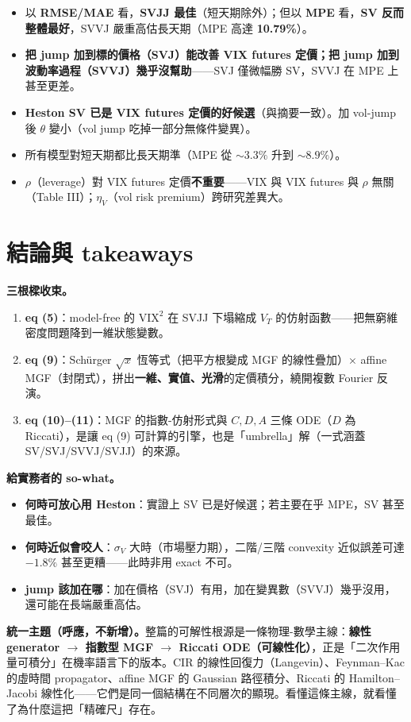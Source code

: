 \documentclass[12pt, a4paper]{article}
\theoremstyle{remark}
\newcommand{\VIX}{\mathrm{VIX}}
\begin{document}
\begin{keybox}[title={核心結論（呼應摘要，忠實轉述）}]
\begin{itemize}[topsep=2pt, itemsep=2pt]
  \item 以 \textbf{RMSE/MAE} 看，\textbf{SVJJ 最佳}（短天期除外）；但以 \textbf{MPE} 看，\textbf{SV 反而整體最好}，SVVJ 嚴重高估長天期（MPE 高達 \textbf{10.79\%}）。
  \item \textbf{把 jump 加到標的價格（SVJ）能改善 VIX futures 定價；把 jump 加到波動率過程（SVVJ）幾乎沒幫助}——SVJ 僅微幅勝 SV，SVVJ 在 MPE 上甚至更差。
  \item \textbf{Heston SV 已是 VIX futures 定價的好候選}（與摘要一致）。加 vol-jump 後 $\theta$ 變小（vol jump 吃掉一部分無條件變異）。
  \item 所有模型對短天期都比長天期準（MPE 從 $\sim3.3\%$ 升到 $\sim8.9\%$）。
  \item $\rho$（leverage）對 VIX futures 定價\textbf{不重要}——VIX 與 VIX futures 與 $\rho$ 無關（Table III）；$\eta_V$（vol risk premium）跨研究差異大。
\end{itemize}
\end{keybox}

\newpage

\section{結論與 takeaways}

\textbf{三根樑收束。}
\begin{enumerate}[topsep=2pt, itemsep=2pt]
  \item \textbf{eq (5)}：model-free 的 $\VIX^2$ 在 SVJJ 下塌縮成 $V_T$ 的仿射函數——把無窮維密度問題降到一維狀態變數。
  \item \textbf{eq (9)}：Schürger $\sqrt{x}$ 恆等式（把平方根變成 MGF 的線性疊加）$\times$ affine MGF（封閉式），拼出\textbf{一維、實值、光滑}的定價積分，繞開複數 Fourier 反演。
  \item \textbf{eq (10)--(11)}：MGF 的指數-仿射形式與 $C,D,A$ 三條 ODE（$D$ 為 Riccati），是讓 eq (9) 可計算的引擎，也是「umbrella」解（一式涵蓋 SV/SVJ/SVVJ/SVJJ）的來源。
\end{enumerate}

\textbf{給實務者的 so-what。}
\begin{itemize}[topsep=2pt, itemsep=1pt]
  \item \textbf{何時可放心用 Heston}：實證上 SV 已是好候選；若主要在乎 MPE，SV 甚至最佳。
  \item \textbf{何時近似會咬人}：$\sigma_V$ 大時（市場壓力期），二階/三階 convexity 近似誤差可達 $-1.8\%$ 甚至更糟——此時非用 exact 不可。
  \item \textbf{jump 該加在哪}：加在價格（SVJ）有用，加在變異數（SVVJ）幾乎沒用，還可能在長端嚴重高估。
\end{itemize}

\textbf{統一主題（呼應，不新增）。}整篇的可解性根源是一條物理-數學主線：\textbf{線性 generator $\to$ 指數型 MGF $\to$ Riccati ODE（可線性化）}，正是「二次作用量可積分」在機率語言下的版本。CIR 的線性回復力（Langevin）、Feynman--Kac 的虛時間 propagator、affine MGF 的 Gaussian 路徑積分、Riccati 的 Hamilton--Jacobi 線性化——它們是同一個結構在不同層次的顯現。看懂這條主線，就看懂了為什麼這把「精確尺」存在。
\end{document}
